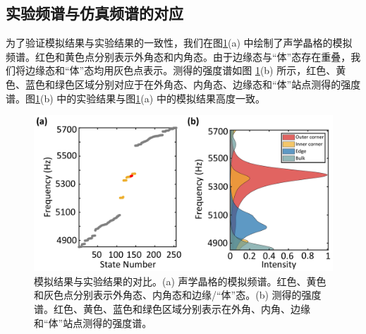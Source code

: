 \subsection{实验频谱与仿真频谱的对应}
为了验证模拟结果与实验结果的一致性，我们在图\ref{fig:Comparation}(a) 中绘制了声学晶格的模拟频谱。红色和黄色点分别表示外角态和内角态。由于边缘态与“体”态存在重叠，我们将边缘态和“体”态均用灰色点表示。测得的强度谱如图 \ref{fig:Comparation}(b) 所示，红色、黄色、蓝色和绿色区域分别对应于在外角态、内角态、边缘态和“体”站点测得的强度谱。图\ref{fig:Comparation}(b) 中的实验结果与图\ref{fig:Comparation}(a) 中的模拟结果高度一致。
\begin{figure}[htbp]
    \centering
    \includegraphics[width=0.75\linewidth]{figure/HOTIExp/Comparation.png}
    \caption{模拟结果与实验结果的对比。(a) 声学晶格的模拟频谱。红色、黄色和灰色点分别表示外角态、内角态和边缘/“体”态。(b) 测得的强度谱。红色、黄色、蓝色和绿色区域分别表示在外角、内角、边缘和“体”站点测得的强度谱。}
    \label{fig:Comparation}
\end{figure}